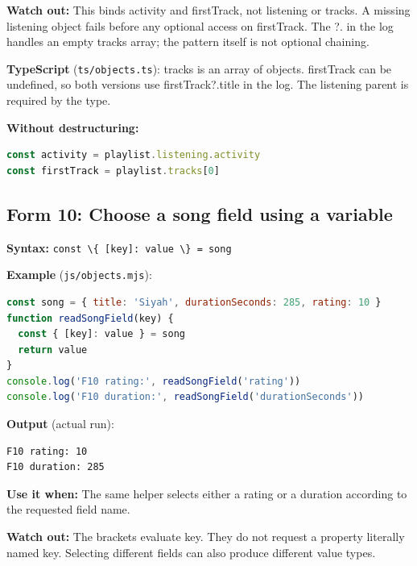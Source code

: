\documentclass[
  10pt,
  a4paper,
  titlepage]{article}
\newcommand{\passthrough}[1]{#1}
\begin{document}
\textbf{Watch out:} This binds activity and firstTrack, not listening or
tracks. A missing listening object fails before any optional access on
firstTrack. The ?. in the log handles an empty tracks array; the pattern
itself is not optional chaining.

\textbf{TypeScript} (\passthrough{\lstinline!ts/objects.ts!}): tracks is
an array of objects. firstTrack can be undefined, so both versions use
firstTrack?.title in the log. The listening parent is required by the
type.


\textbf{Without destructuring:}

\Needspace{41.2pt}
\begin{lstlisting}[language=JavaScript]
const activity = playlist.listening.activity
const firstTrack = playlist.tracks[0]
\end{lstlisting}

\subsection{Form 10: Choose a song field using a
variable}\label{form-10-choose-a-song-field-using-a-variable}

\textbf{Syntax:}
\passthrough{\lstinline!const \{ [key]: value \} = song!}


\textbf{Example} (\passthrough{\lstinline!js/objects.mjs!}):

\Needspace{82.4pt}
\begin{lstlisting}[language=JavaScript]
const song = { title: 'Siyah', durationSeconds: 285, rating: 10 }
function readSongField(key) {
  const { [key]: value } = song
  return value
}
console.log('F10 rating:', readSongField('rating'))
console.log('F10 duration:', readSongField('durationSeconds'))
\end{lstlisting}


\textbf{Output} (actual run):

\Needspace{41.2pt}
\begin{lstlisting}
F10 rating: 10
F10 duration: 285
\end{lstlisting}

\textbf{Use it when:} The same helper selects either a rating or a
duration according to the requested field name.

\textbf{Watch out:} The brackets evaluate key. They do not request a
property literally named key. Selecting different fields can also
produce different value types.
\end{document}
